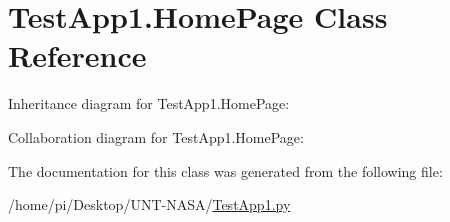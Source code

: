 \hypertarget{classTestApp1_1_1HomePage}{}\section{Test\+App1.\+Home\+Page Class Reference}
\label{classTestApp1_1_1HomePage}


Inheritance diagram for Test\+App1.\+Home\+Page\+:


Collaboration diagram for Test\+App1.\+Home\+Page\+:


The documentation for this class was generated from the following file\+:\begin{DoxyCompactItemize}
\item 
/home/pi/\+Desktop/\+U\+N\+T-\/\+N\+A\+S\+A/\hyperlink{TestApp1_8py}{Test\+App1.\+py}\end{DoxyCompactItemize}
